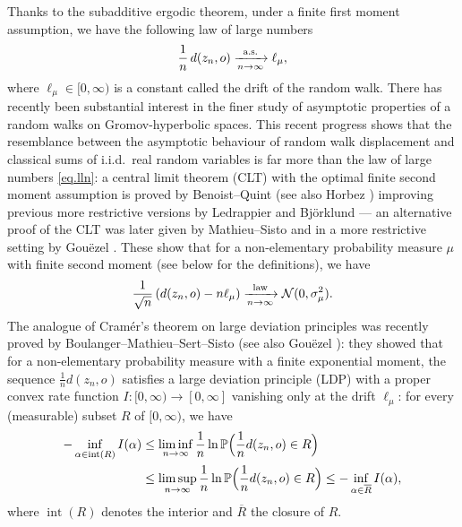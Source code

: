 \documentclass[JEP,XML,SOM,Unicode,published]{cedram}
\theoremstyle{plain}
\theoremstyle{definition}
\DeclareMathOperator\inte{int}
\begin{document}
Thanks to the subadditive ergodic theorem, under a finite first moment assumption, we have the following law of large numbers
\begin{equation}\label{eq.lln}
\frac{1}{n}\, d(z_n,o) \xrightarrow[n \to \infty]{\textup{a.s.}} \ell_\mu,
\end{equation}
where $\ell_\mu \in [0,\infty)$ is a constant called the drift of the random walk. There has recently been substantial interest in the finer study of asymptotic properties of a random walks on Gromov-hyperbolic spaces. This recent progress shows that the resemblance between the asymptotic behaviour of random walk displacement and classical sums of i.i.d.~real random variables is far more than the law of large numbers \eqref{eq.lln}: a central limit theorem (CLT) with the optimal finite second moment assumption is proved by Benoist--Quint \cite{BQ.hyperbolic} (see also Horbez \cite{horbez}) improving previous more restrictive versions by Ledrappier \cite{ledrappier.lecturenotes} and Björklund \cite{bjorklund} --- an alternative proof of the CLT was later given by Mathieu--Sisto \cite{mathieu-sisto} and in a more restrictive setting by Gouëzel \cite{gouezel.gap}. These show that for a non-elementary probability measure $\mu$ with finite second moment (see below for the definitions), we have
\begin{equation}\label{eq.clt}
\frac{1}{\sqrt{n}}\,(d(z_n,o) - n \ell_\mu) \xrightarrow[n \to \infty]{\textup{law}} \mathcal{N}(0,\sigma_{\mu}^2).
\end{equation}
The analogue of Cramér's theorem on large deviation principles was recently proved by Boulanger--Mathieu--Sert--Sisto \cite{BMSS} (see also Gouëzel \cite{gouezel.first.moment}): they showed that for a non-elementary probability measure with a finite exponential moment, the sequence $\frac{1}{n}d(z_n,o)$ satisfies a large deviation principle (LDP) with a proper convex rate function $I:[0,\infty) \to [0,\infty]$ vanishing only at the drift $\ell_\mu$: for every (measurable) subset $R$ of $[0,\infty)$, we have
\begin{equation}\label{eq.ldp}
\begin{split}
-\inf_{\alpha \in \inte(R)} I(\alpha) &\leq \liminf_{n \to \infty} \frac{1}{n}\ln \mathbb{P}\Bigl(\frac{1}{n}d(z_n,o) \in R\Bigr)\\
&\leq \limsup_{n \to \infty} \frac{1}{n}\ln \mathbb{P}\Bigl(\frac{1}{n}d(z_n,o) \in R\Bigr) \leq -\inf_{\alpha \in \overline{R}} I(\alpha),
\end{split}
\end{equation}
where $\inte(R)$ denotes the interior and $\overline{R}$ the closure of $R$.
\end{document}
